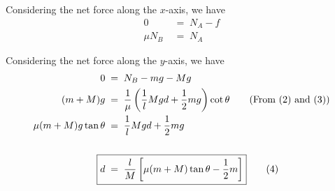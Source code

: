 \documentclass[11pt,reqno]{article}
\begin{document}
Considering the net force along the $x$-axis, we have
\begin{align*}
	0					\;&=\;	N_A - f								\\
	\mu N_B				\;&=\;	N_A									\tag{3}
\end{align*}

Considering the net force along the $y$-axis, we have
\begin{align*}
	0					\;&=\;	N_B - mg - Mg						\\
	(m + M)g			\;&=\;	\frac{1}{\mu}\left(\frac{1}{l}Mgd + \frac{1}{2}mg\right)\cot\theta	\tag{From (2) and (3)}				\\
	\mu(m + M)g\tan\theta	\;&=\;	\frac{1}{l}Mgd + \frac{1}{2}mg							\\\\
	\Aboxed{d					\;&=\;	\frac{l}{M}\left[\mu(m + M)\tan\theta - \frac{1}{2}m \right]		}		\tag{4}
\end{align*}
\end{document}
